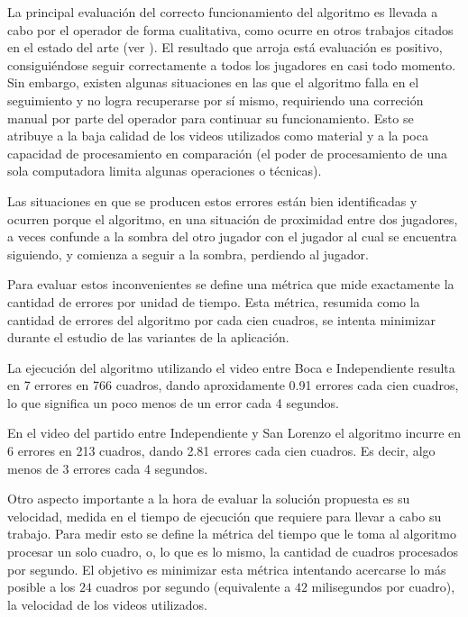 La principal evaluación del correcto funcionamiento del algoritmo es llevada a
cabo por el operador de forma cualitativa, como ocurre en otros trabajos
citados en el estado del arte (ver \cite{papers-tanos}). El resultado que
arroja está evaluación es positivo, consiguiéndose seguir correctamente a
todos los jugadores en casi todo momento. Sin embargo, existen algunas
situaciones en las que el algoritmo falla en el seguimiento y no logra
recuperarse por sí mismo, requiriendo una correción manual por parte del
operador para continuar su funcionamiento. Esto se atribuye a la baja calidad
de los videos utilizados como material y a la poca capacidad de procesamiento
en comparación (el poder de procesamiento de una sola computadora limita
algunas operaciones o técnicas).

Las situaciones en que se producen estos errores están bien identificadas
y ocurren porque el algoritmo, en una situación de proximidad entre dos
jugadores, a veces confunde a la sombra del otro jugador con el jugador
al cual se encuentra siguiendo, y comienza a seguir a la sombra, perdiendo
al jugador.

Para evaluar estos inconvenientes se define una métrica que mide exactamente la
cantidad de errores por unidad de tiempo. Esta métrica, resumida como la
cantidad de errores del algoritmo por cada cien cuadros, se intenta minimizar
durante el estudio de las variantes de la aplicación.

La ejecución del algoritmo utilizando el video entre Boca e Independiente
resulta en 7 errores en 766 cuadros, dando aproxidamente 0.91 errores cada cien
cuadros, lo que significa un poco menos de un error cada 4 segundos.

En el video del partido entre Independiente y San Lorenzo el algoritmo incurre
en 6 errores en 213 cuadros, dando 2.81 errores cada cien cuadros. Es decir,
algo menos de 3 errores cada 4 segundos.

Otro aspecto importante a la hora de evaluar la solución propuesta es su
velocidad, medida en el tiempo de ejecución que requiere para llevar a cabo su
trabajo. Para medir esto se define la métrica del tiempo que le toma al
algoritmo procesar un solo cuadro, o, lo que es lo mismo, la cantidad de
cuadros procesados por segundo. El objetivo es minimizar esta métrica
intentando acercarse lo más posible a los $24$ cuadros por segundo (equivalente
a $42$ milisegundos por cuadro), la velocidad de los videos utilizados.


